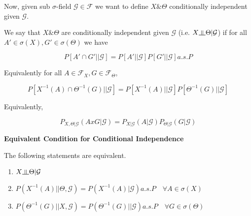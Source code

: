 \documentclass[11pt,fleqn]{book} %
\newcommand{\indep}{\rotatebox[origin=c]{90}{$\models$}}
\begin{document}
Now, given sub $\sigma$-field $\mathcal{G} \in \mathcal{F}$ we want to define $X \& \Theta$ conditionally independent given $\mathcal{G}$. 

\begin{definition}
	We say that $X \& \Theta$ are conditionally independent given $\mathcal{G}$ (i.e. $X \indep \Theta | \mathcal{G}$) if for all $A' \in \sigma(X), G' \in \sigma(\Theta)$ we have 

			$$P[A' \cap G' || \mathcal{G}] = P[A' || \mathcal{G}]P[G' || \mathcal{G}] a.s. P $$

	Equivalently for all $A \in \mathcal{F}_X, G \in \mathcal{F}_\Theta$, 

			$$P[X^{-1}(A) \cap \Theta^{-1}(G) || \mathcal{G}] =P[X^{-1}(A) || \mathcal{G}]P[\Theta^{-1}(G) || \mathcal{G}]  $$

	Equivalently, 

			$$P_{X, \Theta | \mathcal{G}} (A x G | \mathcal{G}) = P_{X|\mathcal{G}}(A | \mathcal{G}) P_{\Theta|\mathcal{G}} (G | \mathcal{G}) $$
\end{definition}


\textbf{Equivalent Condition for Conditional Independence}\\

\begin{theorem}[1.1 in Notes]
	The following statements are equivalent. 

	\begin{enumerate}
		\item $X \indep \Theta | \mathcal{G}$
		\item $P(X^{-1}(A) || \Theta, \mathcal{G}) = P(X^{-1}(A)| \mathcal{G}) a.s. P \quad \forall A \in \sigma(X)$
		\item $P(\Theta^{-1}(G) || X, \mathcal{G}) = P(\Theta^{-1}(G)|| \mathcal{G}) a.s. P \quad \forall G \in \sigma(\Theta)$
	\end{enumerate}
\end{theorem}
\end{document}

